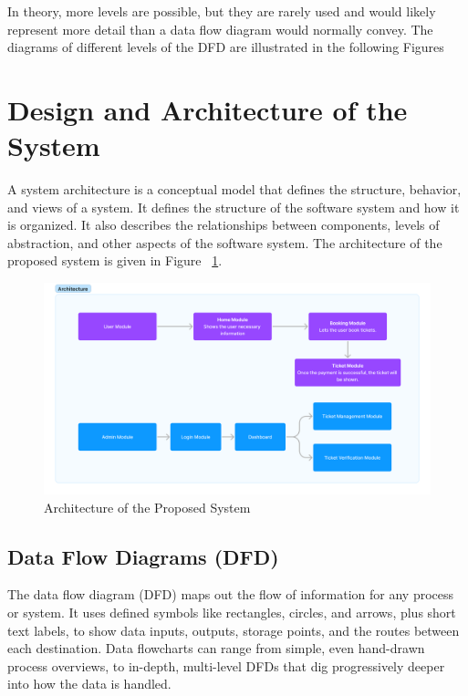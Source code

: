 \documentclass[12pt,a4paper]{report}
\begin{document}
In theory, more levels are possible, but they are rarely used and would likely represent more detail than a data flow diagram would normally convey. The diagrams of different levels of the DFD are illustrated in the following Figures

\section{Design and Architecture of the System}
A system architecture is a conceptual model that defines the structure, behavior, and views of a system. It defines the structure of the software system and how it is organized. It also describes the relationships between components, levels of abstraction, and other aspects of the software system. The architecture of the proposed system is given in Figure ~\ref{architecture}.
\begin{figure}[h]
    \centering
    \includegraphics[width=\textwidth]{assets/Architecture.png}
    \caption{Architecture of the Proposed System}
    \label{architecture}
\end{figure}

\subsection{Data Flow Diagrams (DFD)}
The data flow diagram (DFD) maps out the flow of information for any process or system. It uses defined symbols like rectangles, circles, and arrows, plus short text labels, to show data inputs, outputs, storage points, and the routes between each destination. Data flowcharts can range from simple, even hand-drawn process overviews, to in-depth, multi-level DFDs that dig progressively deeper into how the data is handled.
\end{document}
